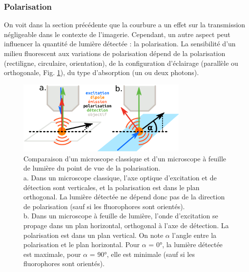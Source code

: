 

\subsubsection{Polarisation}

On voit dans la section précédente que la courbure a un effet sur la transmission négligeable dans le contexte de l'imagerie. Cependant, un autre aspect peut influencer la quantité de lumière détectée : la polarisation. La sensibilité d'un milieu fluorescent aux variations de polarisation dépend de la polarisation (rectiligne, circulaire, orientation), de la configuration d'éclairage (parallèle ou orthogonale, Fig. \ref{FIGpolarisation}), du type d'absorption (un ou deux photons).

\begin{figure}[h!]
    \centering
    \includegraphics[width=0.75\textwidth]{./files/polarization_plane.svg.png}
    \caption{Comparaison d'un microscope classique et d'un microscope à feuille de lumière du point de vue de la polarisation.
    \\ a. Dans un microscope classique, l'axe optique d'excitation et de détection sont verticales, et la polarisation est dans le plan orthogonal. La lumière détectée ne dépend donc pas de la direction de polarisation (sauf si les fluorophores sont orientés).
    \\ b. Dans un microscope à feuille de lumière, l'onde d'excitation se propage dans un plan horizontal, orthogonal à l'axe de détection. La polarisation est dans un plan vertical. On note $\alpha$ l'angle entre la polarisation et le plan horizontal. Pour $\alpha$ = 0°, la lumière détectée est maximale, pour $\alpha$ = 90°, elle est minimale (sauf si les fluorophores sont orientés).
    \label{FIGpolarisation}}
\end{figure}


